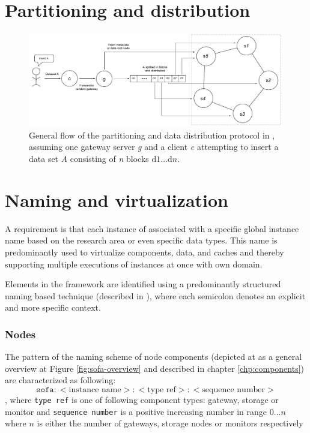 \section{Partitioning and distribution}
\begin{figure}[h!]
	\centering
	\includegraphics[scale=0.5]{pdf/rr-partitioning.pdf}
	\caption[Overview of the partitioning and data distribution protocol]{General flow of the partitioning and data distribution protocol in \CodeName, assuming one gateway server \textit{g} and a client \textit{c} attempting to insert a data set \textit{A} consisting of \textit{n} blocks $\text{d}1 \ldots \text{d}n$.\label{fig:rr-partitioning}}
\end{figure}

\section{Naming and virtualization}
A requirement is that each instance of \CodeNameFull associated with a specific global instance name \eg based on the research area or even specific data types. This name is predominantly used to virtualize components, data, and caches and thereby supporting multiple executions of \CodeName instances at once with own domain.
\newline

Elements in the framework are identified using a predominantly structured naming based technique (described in \cite{Tanenbaum:2006:DSP:1202502}), where each semicolon denotes an explicit and more specific context. 

\subsubsection*{Nodes}
The pattern of the naming scheme of node components (depicted at as a general overview at Figure \ref{fig:sofa-overview} and described in chapter \ref{chp:components}) are characterized as following:
\vspace*{2mm}
\begin{equation*}
	\texttt{sofa}:<\text{instance name}>:<\text{type ref}>:<\text{sequence number}>
\end{equation*}
, where \texttt{type ref} is one of following component types: gateway, storage or monitor and \texttt{sequence number} is a positive increasing number in range $0\ldots n$ where $n$ is either the number of gateways, storage nodes or monitors respectively

